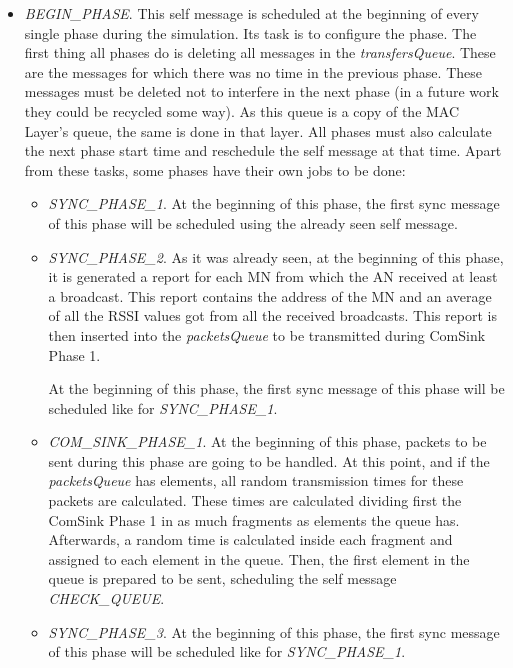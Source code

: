 \begin{itemize}
\begin{itemize}
    \item \textit{BEGIN\_PHASE}. This self message is scheduled at the beginning of every single phase during the simulation. Its task is to 
    configure the phase. The first thing all phases do is deleting all messages in the \textit{transfersQueue}. These are the messages for which 
    there was no time in the previous phase. These messages must be deleted not to interfere in the next phase (in a future work they could be 
    recycled some way). As this queue is a copy of the \ac{MAC} Layer's queue, the same is done in that layer. All phases must also calculate the 
    next phase start time and reschedule the self message at that time. Apart from these tasks, some phases have their own jobs to be done:
    \begin{itemize}
      \item \textit{SYNC\_PHASE\_1}. At the beginning of this phase, the first sync message of this phase will be scheduled using the 
      already seen self message.

      \item \textit{SYNC\_PHASE\_2}. As it was already seen, at the beginning of this phase, it is generated a report for each \ac{MN} from which 
      the \ac{AN} received at least a broadcast. This report contains the address of the \ac{MN} and an average of all the \ac{RSSI} values 
      got from all the received broadcasts. This report is then inserted into the \textit{packetsQueue} to be transmitted during ComSink Phase 1.
      
      At the beginning of this phase, the first sync message of this phase will be scheduled like for \textit{SYNC\_PHASE\_1}.

      \item \textit{COM\_SINK\_PHASE\_1}. At the beginning of this phase, packets to be sent during this phase are going to be handled. At 
      this point, and if the \textit{packetsQueue} has elements, all random transmission times for these packets are calculated. These times 
      are calculated dividing first the ComSink Phase 1 in as much fragments as elements the queue has. Afterwards, a random time is 
      calculated inside each fragment and assigned to each element in the queue. Then, the first element in the queue is prepared to be 
      sent, scheduling the self message \textit{CHECK\_QUEUE}.

      \item \textit{SYNC\_PHASE\_3}. At the beginning of this phase, the first sync message of this phase will be scheduled like 
      for \textit{SYNC\_PHASE\_1}.
    \end{itemize}
  \end{itemize}
\end{itemize}


